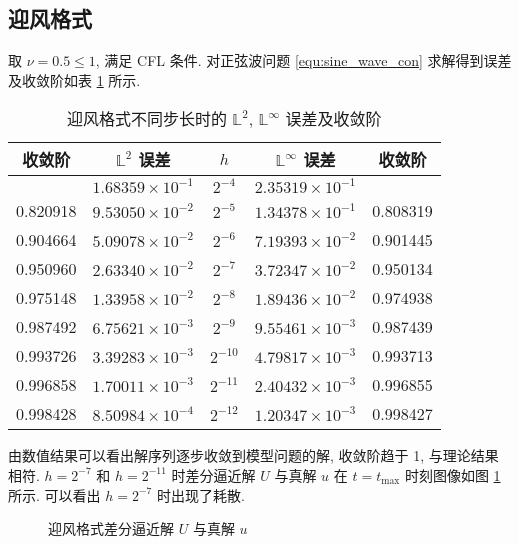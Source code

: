 \documentclass[UTF8, a4paper, 12pt, oneside, onecolumn]{article}
\begin{document}
\subsection{迎风格式}

取 $\nu = 0.5 \leq 1$, 满足 CFL 条件. 对正弦波问题 \eqref{equ:sine_wave_con} 求解得到误差及收敛阶如表 \ref{tab:upwind_err} 所示.

\begin{table}[H]\centering\heiti{}
	\caption{迎风格式不同步长时的 $\mathbb{L}^2$, $\mathbb{L}^\infty$ 误差及收敛阶}\label{tab:upwind_err}
	\begin{tabular}{|c|c|c|c|c|}\hline
		收敛阶	&	$\mathbb{L}^2$ 误差	&	$h$	&	$\mathbb{L}^\infty$ 误差		&	收敛阶\\\hline
					&	$1.68359 \times 10^{-1}$	&	$2^{-4}$	&	$2.35319 \times 10^{-1}$	&			\\\hline
		0.820918	&	$9.53050 \times 10^{-2}$	&	$2^{-5}$	&	$1.34378 \times 10^{-1}$	&	0.808319\\\hline
		0.904664	&	$5.09078 \times 10^{-2}$	&	$2^{-6}$	&	$7.19393 \times 10^{-2}$	&	0.901445\\\hline
		0.950960	&	$2.63340 \times 10^{-2}$	&	$2^{-7}$	&	$3.72347 \times 10^{-2}$	&	0.950134\\\hline
		0.975148	&	$1.33958 \times 10^{-2}$	&	$2^{-8}$	&	$1.89436 \times 10^{-2}$	&	0.974938\\\hline
		0.987492	&	$6.75621 \times 10^{-3}$	&	$2^{-9}$	&	$9.55461 \times 10^{-3}$	&	0.987439\\\hline
		0.993726	&	$3.39283 \times 10^{-3}$	&	$2^{-10}$	&	$4.79817 \times 10^{-3}$	&	0.993713\\\hline
		0.996858	&	$1.70011 \times 10^{-3}$	&	$2^{-11}$	&	$2.40432 \times 10^{-3}$	&	0.996855\\\hline
		0.998428	&	$8.50984 \times 10^{-4}$	&	$2^{-12}$	&	$1.20347 \times 10^{-3}$	&	0.998427\\\hline
	\end{tabular}
\end{table}

由数值结果可以看出解序列逐步收敛到模型问题的解, 收敛阶趋于 1, 与理论结果相符. $h = 2^{-7}$ 和 $h = 2^{-11}$ 时差分逼近解 $U$ 与真解 $u$ 在 $t = t_{\max }$ 时刻图像如图 \ref{fig:upwind_Uu} 所示. 可以看出 $h = 2^{-7}$ 时出现了耗散.

\begin{figure}[H]\centering{}
	\resizebox{0.4\linewidth}{!}{}\quad
	\resizebox{0.4\linewidth}{!}{}
	\caption{迎风格式差分逼近解 $U$ 与真解 $u$}\label{fig:upwind_Uu}
\end{figure}
\end{document}
